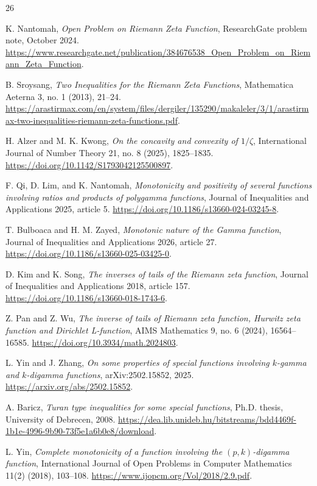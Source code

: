 \documentclass[11pt]{article}
\numberwithin{equation}{section}
\theoremstyle{definition}
\theoremstyle{remark}
\newcommand{\1}{\mathbf 1}
\begin{document}
\begin{thebibliography}{26}

K. Nantomah,
\emph{Open Problem on Riemann Zeta Function},
ResearchGate problem note, October 2024.
\url{https://www.researchgate.net/publication/384676538_Open_Problem_on_Riemann_Zeta_Function}.

B. Sroysang,
\emph{Two Inequalities for the Riemann Zeta Functions},
Mathematica Aeterna 3, no. 1 (2013), 21--24.
\url{https://arastirmax.com/en/system/files/dergiler/135290/makaleler/3/1/arastirmax-two-inequalities-riemann-zeta-functions.pdf}.

H. Alzer and M. K. Kwong,
\emph{On the concavity and convexity of \(1/\zeta\)},
International Journal of Number Theory 21, no. 8 (2025), 1825--1835.
\url{https://doi.org/10.1142/S1793042125500897}.

F. Qi, D. Lim, and K. Nantomah,
\emph{Monotonicity and positivity of several functions involving ratios and products of polygamma functions},
Journal of Inequalities and Applications 2025, article 5.
\url{https://doi.org/10.1186/s13660-024-03245-8}.

T. Bulboaca and H. M. Zayed,
\emph{Monotonic nature of the Gamma function},
Journal of Inequalities and Applications 2026, article 27.
\url{https://doi.org/10.1186/s13660-025-03425-0}.

D. Kim and K. Song,
\emph{The inverses of tails of the Riemann zeta function},
Journal of Inequalities and Applications 2018, article 157.
\url{https://doi.org/10.1186/s13660-018-1743-6}.

Z. Pan and Z. Wu,
\emph{The inverse of tails of Riemann zeta function, Hurwitz zeta function and Dirichlet L-function},
AIMS Mathematics 9, no. 6 (2024), 16564--16585.
\url{https://doi.org/10.3934/math.2024803}.


L. Yin and J. Zhang,
\emph{On some properties of special functions involving \(k\)-gamma and \(k\)-digamma functions},
arXiv:2502.15852, 2025.
\url{https://arxiv.org/abs/2502.15852}.


A. Baricz,
\emph{Turan type inequalities for some special functions},
Ph.D. thesis, University of Debrecen, 2008.
\url{https://dea.lib.unideb.hu/bitstreams/bdd4469f-1b1e-4996-9b90-73f5e1a6b0e8/download}.

L. Yin,
\emph{Complete monotonicity of a function involving the \((p,k)\)-digamma function},
International Journal of Open Problems in Computer Mathematics 11(2) (2018), 103--108.
\url{https://www.ijopcm.org/Vol/2018/2.9.pdf}.


\end{thebibliography}
\end{document}
